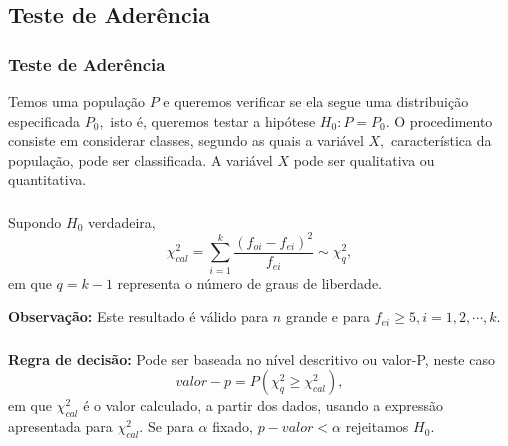 \documentclass[14pt,aspectratio=1610]{beamer}
\newcommand{\Ho}{\ensuremath{H_{0}}}
\begin{document}
\subsection{Teste de Aderência}
\begin{frame}{}
\frametitle{Teste de Aderência}
\begin{block}{}
\justifying
Temos uma população $P$ e queremos verificar se ela segue uma distribuição
especificada $P_{0},$ isto é, queremos testar a hipótese $\Ho: P = P_{0}.$ O procedimento consiste em considerar classes, segundo as quais a variável $X,$ característica da população, pode ser classificada. A variável $X$ pode ser qualitativa ou quantitativa.
\end{block}
\end{frame}

% 

\begin{frame}{}
\frametitle{}
\begin{block}{}
\justifying
Supondo $\Ho$ verdadeira, 
$$\chi^{2}_{cal}={\displaystyle \sum_{i=1}^{k}\dfrac{(f_{oi}-f_{ei})^{2}}{f_{ei}}}\sim \chi^{2}_{q},$$
em que $q=k-1$ representa o número de graus de liberdade. 

{\bf Observação:} Este resultado é válido para $n$ grande e para $f_{ei}\geq 5, i=1,2,\cdots, k.$
\end{block}
\end{frame}

\begin{frame}{}
\frametitle{}
\begin{block}{}
\justifying
{\bf Regra de decisão:} Pode ser baseada no nível descritivo ou valor-P, neste caso
$$valor-p=P(\chi^{2}_{q}\geq \chi^{2}_{cal}),$$
em que $\chi^{2}_{cal}$ é o valor calculado, a partir dos dados, usando a expressão apresentada para $\chi^{2}_{cal}.$ Se para $\alpha$ fixado, $p-valor<\alpha$ rejeitamos $\Ho.$

\end{block}
\end{frame}
\end{document}
